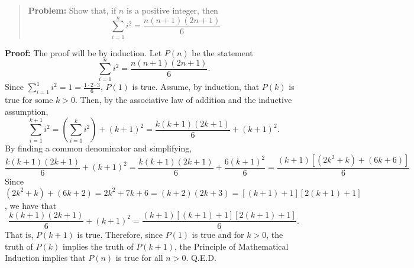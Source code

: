 \documentclass[10pt]{article}
\begin{document}
\begin{quote}
\textbf{Problem:} Show that, if $n$ is a positive integer, then
\[ \sum_{i=1}^{n} i^2 = \frac{n(n+1)(2n+1)}{6}\]
\end{quote}
\textbf{Proof:
} The proof will be by induction. Let $P(n)$ be the statement
\[ \sum_{i=1}^{n} i^2 = \frac{n(n+1)(2n+1)}{6}.\]
Since $\sum_{i=1}^1 i^2 = 1 = \frac{1\cdot2\cdot 3}{6}$, $P(1)$ is true.
Assume, by induction, that $P(k)$ is true for some $k > 0$. Then,
by the associative law
of addition and the inductive assumption,
\[
\sum_{i=1}^{k+1} i^2 = \left(\sum_{i=1}^{k} i^2\right) + (k+1)^2
= \frac{k(k+1)(2k+1)}{6} + (k+1)^2. \]
By finding a common denominator and simplifying,
\[ \frac{k(k+1)(2k+1)}{6} + (k+1)^2 = \frac{k(k+1)(2k+1)}{6}+
\frac{6(k+1)^2}{6} = \frac{(k+1)[(2k^2+k)+(6k+6)]}{6}\]
Since $(2k^2+k)+(6k+2) = 2k^2 + 7k + 6 = (k+2)(2k+3) = [(k+1)+1][2(k+1)+1]$,
we have that
\[ \frac{k(k+1)(2k+1)}{6} + (k+1)^2 = \frac{(k+1)[(k+1)+1][2(k+1)+1]}{6}.\]
That is, $P(k+1)$ is true.
Therefore, since $P(1)$ is true and for $k > 0$, the truth of $P(k)$ implies the
truth of $P(k+1)$, the Principle of Mathematical
Induction implies that $P(n)$ is true for all $n > 0$. Q.E.D.
\end{document}
